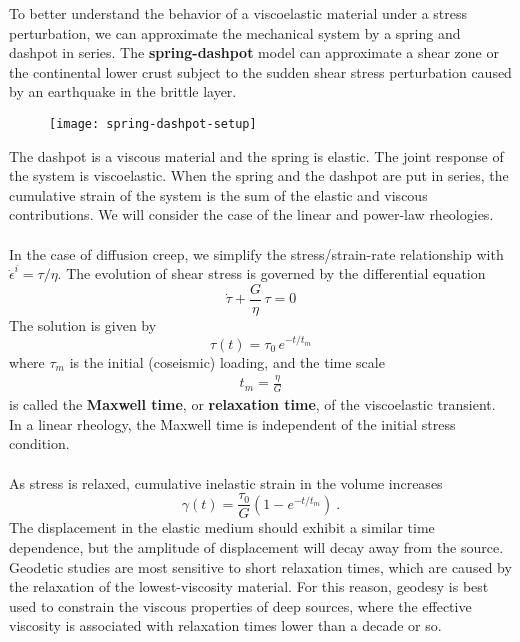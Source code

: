 \documentclass[letterpaper,12pt,]{memoir}
\begin{document}
To better understand the behavior of a viscoelastic material under a stress perturbation, we can approximate the mechanical system by a spring and dashpot in series. The \textbf{spring-dashpot} model can approximate a shear zone or the continental lower crust subject to the sudden shear stress perturbation caused by an earthquake in the brittle layer.
%
\begin{figure}[h]
\begin{center}
\texttt{[image: spring-dashpot-setup]}
\end{center}
\vspace{-0.5cm}
\end{figure}
%
The dashpot is a viscous material and the spring is elastic. The joint response of the system is viscoelastic. When the spring and the dashpot are put in series, the cumulative strain of the system is the sum of the elastic and viscous contributions. We will consider the case of the linear and power-law rheologies. \\
\\
In the case of diffusion creep, we simplify the stress/strain-rate relationship with $\dot{\epsilon}^i=\tau/\eta$. The evolution of shear stress is governed by the differential equation
\begin{equation}\label{eqn:power-law-creep}
\dot{\tau}+\frac{G}{\eta}\,\tau=0
\end{equation}
The solution is given by
\begin{equation}
\tau(t)=\tau_0\,e^{-t/t_m}
\end{equation}
where $\tau_m$ is the initial (coseismic) loading, and the time scale
\begin{equation}\label{eqn:linear_time_scale}
\boxed{\begin{aligned}
t_m=\frac{\eta}{G}
\end{aligned}}
\end{equation}
is called the \textbf{Maxwell time}, or \textbf{relaxation time}, of the viscoelastic transient. In a linear rheology, the Maxwell time is independent of the initial stress condition. \\
\\
As stress is relaxed, cumulative inelastic strain in the volume increases 
\begin{equation}\label{eqn:linear-strain}
\gamma(t)=\frac{\tau_0}{G}\left(1-e^{-t/t_m}\right)~.
\end{equation}
The displacement in the elastic medium should exhibit a similar time dependence, but the amplitude of displacement will decay away from the source. Geodetic studies are most sensitive to short relaxation times, which are caused by the relaxation of the lowest-viscosity material. For this reason, geodesy is best used to constrain the viscous properties of deep sources, where the effective viscosity is associated with relaxation times lower than a decade or so.\\
\end{document}
